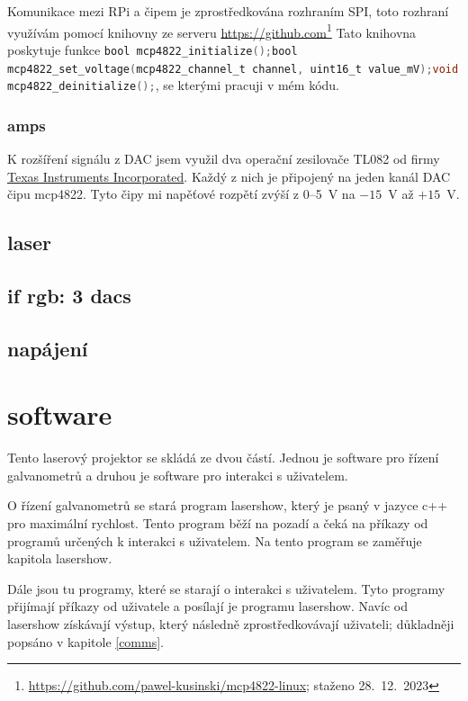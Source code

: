\documentclass{template/socthesis}
\begin{document}
Komunikace mezi RPi a čipem je zprostředkována rozhraním SPI, toto rozhraní využívám pomocí knihovny ze serveru \url{https://github.com}\footnote{\url{https://github.com/pawel-kusinski/mcp4822-linux}; staženo 28.~12.~2023}  
Tato knihovna poskytuje funkce \lstinline[language=C]!bool mcp4822_initialize();bool mcp4822_set_voltage(mcp4822_channel_t channel, uint16_t value_mV);void mcp4822_deinitialize();!, se kterými pracuji v mém kódu.
\subsection{amps}
K rozšíření signálu z DAC jsem využil dva operační zesilovače TL082 od firmy \href{https://www.ti.com/}{Texas Instruments Incorporated}. Každý z nich je připojený na jeden kanál DAC čipu mcp4822.
Tyto čipy mi napěťové rozpětí zvýší z 0--5~V na $-15$~V až $+15$~V.

\section{laser}
\section{if rgb: 3 dacs}



\section{napájení}

\chapter{software}
Tento laserový projektor se skládá ze dvou částí. Jednou je software pro řízení galvanometrů a druhou je software pro interakci s uživatelem.

O řízení galvanometrů se stará program lasershow, který je psaný v jazyce c++ pro maximální rychlost. Tento program běží na pozadí a čeká na příkazy od programů určených k interakci s uživatelem. Na tento program se zaměřuje kapitola lasershow. 

Dále jsou tu programy, které se starají o interakci s uživatelem. Tyto programy přijímají příkazy od uživatele a posílají je programu lasershow. Navíc od lasershow získávají výstup, který následně zprostředkovávají uživateli; důkladněji popsáno v kapitole \ref{comms}.
\end{document}
